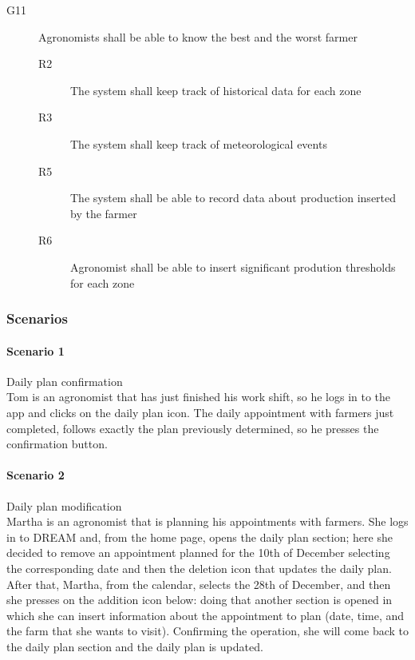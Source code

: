 \begin{description}
\begin{description}
    \end{description}
    \item [G11] Agronomists shall be able to know the best and the worst farmer
    \begin{description}
        \item[R2] The system shall keep track of historical data for each zone
        \item[R3] The system shall keep track of meteorological events
        \item[R5] The system shall be able to record data about production inserted by the farmer
        \item[R6] Agronomist shall be able to insert significant prodution thresholds for each zone   
    \end{description}
\end{description}

\subsubsection{Scenarios}
\paragraph{Scenario 1} Daily plan confirmation\\
Tom is an agronomist that has just finished his work shift, so he logs in to the app and clicks on the daily plan icon.
The daily appointment with farmers just completed, follows exactly the plan previously determined, so he presses the
confirmation button.

\bigskip
\paragraph{Scenario 2} Daily plan modification\\
Martha is an agronomist that is planning his appointments with farmers. She logs in to DREAM and, from the home page,
opens the daily plan section; here she decided to remove an appointment planned for the 10th of December selecting the
corresponding date and then the deletion icon that updates the daily plan. After that, Martha, from the calendar,
selects the 28th of December, and then she presses on the addition icon below: doing that another section is opened in
which she can insert information about the appointment to plan (date, time, and the farm that she wants to visit).
Confirming the operation, she will come back to the daily plan section and the daily plan is updated.

